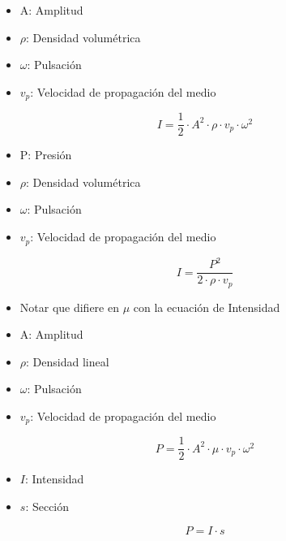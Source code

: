 \vspace{0.25cm}
\begin{itemize}
    \item A: Amplitud
    \item $\rho$: Densidad volumétrica
    \item $\omega$: Pulsación
    \item $v_p$: Velocidad de propagación del medio
\end{itemize}
\begin{equation}
    I = \frac{1}{2} \cdot A^2 \cdot \rho \cdot v_p \cdot \omega^2
\end{equation}

\vspace{0.25cm}
\begin{itemize}
    \item P: Presión
    \item $\rho$: Densidad volumétrica
    \item $\omega$: Pulsación
    \item $v_p$: Velocidad de propagación del medio
\end{itemize}
\begin{equation}
    I = \frac{P^2}{2\cdot \rho \cdot v_p}
\end{equation}

\begin{itemize}
    \item Notar que difiere en $\mu$ con la ecuación de Intensidad
    \item A: Amplitud
    \item $\rho$: Densidad lineal
    \item $\omega$: Pulsación
    \item $v_p$: Velocidad de propagación del medio
\end{itemize}
\begin{equation}
    P = \frac{1}{2} \cdot A^2 \cdot \mu \cdot v_p \cdot \omega^2
\end{equation}

\begin{itemize}
    \item $I$: Intensidad
    \item $s$: Sección
\end{itemize}
\begin{equation}
    P = I \cdot s
\end{equation}

